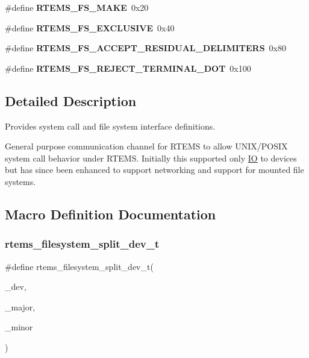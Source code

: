 \begin{DoxyCompactItemize}
\#define {\bfseries R\+T\+E\+M\+S\+\_\+\+F\+S\+\_\+\+M\+A\+KE}~0x20
\item 
\mbox{\label{group__LibIO_gad8268d77a0965cae0a42134fa3d0db4c}} 
\#define {\bfseries R\+T\+E\+M\+S\+\_\+\+F\+S\+\_\+\+E\+X\+C\+L\+U\+S\+I\+VE}~0x40
\item 
\mbox{\label{group__LibIO_ga98f7d57e9c307145aec509bed785882a}} 
\#define {\bfseries R\+T\+E\+M\+S\+\_\+\+F\+S\+\_\+\+A\+C\+C\+E\+P\+T\+\_\+\+R\+E\+S\+I\+D\+U\+A\+L\+\_\+\+D\+E\+L\+I\+M\+I\+T\+E\+RS}~0x80
\item 
\mbox{\label{group__LibIO_gaff4bd106484e40158194925a2905e5ce}} 
\#define {\bfseries R\+T\+E\+M\+S\+\_\+\+F\+S\+\_\+\+R\+E\+J\+E\+C\+T\+\_\+\+T\+E\+R\+M\+I\+N\+A\+L\+\_\+\+D\+OT}~0x100
\end{DoxyCompactItemize}


\subsection{Detailed Description}
Provides system call and file system interface definitions. 

General purpose communication channel for R\+T\+E\+MS to allow U\+N\+I\+X/\+P\+O\+S\+IX system call behavior under R\+T\+E\+MS. Initially this supported only \mbox{\hyperlink{structIO}{IO}} to devices but has since been enhanced to support networking and support for mounted file systems. 

\subsection{Macro Definition Documentation}
\mbox{\label{group__LibIO_gacab042aecc8b26ebac9a41233eac479f}} 
\subsubsection{\texorpdfstring{rtems\_filesystem\_split\_dev\_t}{rtems\_filesystem\_split\_dev\_t}}
{\footnotesize\ttfamily \#define rtems\+\_\+filesystem\+\_\+split\+\_\+dev\+\_\+t(\begin{DoxyParamCaption}\item[{}]{\+\_\+dev,  }\item[{}]{\+\_\+major,  }\item[{}]{\+\_\+minor }\end{DoxyParamCaption})}

